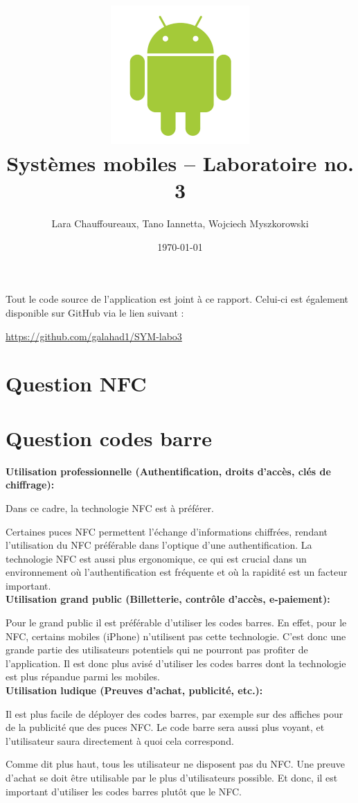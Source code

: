 \documentclass[12pt]{article}
\title{\includegraphics[width=200px]{title}\\
  \vspace{40 mm}
  \huge{Systèmes mobiles -- Laboratoire no. 3}
\vspace{20 mm}
}
\author{Lara Chauffoureaux, Tano Iannetta, Wojciech Myszkorowski}
\date{\today}
\begin{document}
\maketitle
\thispagestyle{empty}
\clearpage

Tout le code source de l'application est joint à ce rapport. Celui-ci est également disponible sur GitHub via le lien suivant : 

\url{https://github.com/galahad1/SYM-labo3}

\section*{Question NFC}

\section*{Question codes barre}

\textbf{Utilisation professionnelle (Authentification, droits d'accès, clés de chiffrage):}
\medskip

Dans ce cadre, la technologie NFC est à préférer.

Certaines puces NFC permettent l'échange d'informations chiffrées, rendant l'utilisation du NFC préférable dans l'optique d'une authentification.
La technologie NFC est aussi plus ergonomique, ce qui est crucial dans un environnement où l'authentification est fréquente et où la rapidité est un facteur important. \\

\textbf{Utilisation grand public (Billetterie, contrôle d'accès, e-paiement):} \medskip

Pour le grand public il est préférable d'utiliser les codes barres. En effet, pour le NFC, certains mobiles (iPhone) n'utilisent pas cette technologie. C'est donc une grande partie des utilisateurs potentiels qui ne pourront pas profiter de l'application. Il est donc plus avisé d'utiliser les codes barres dont la technologie est plus répandue parmi les mobiles.\\

\textbf{Utilisation ludique (Preuves d'achat, publicité, etc.):}
\medskip

Il est plus facile de déployer des codes barres, par exemple sur des affiches pour de la publicité que des puces NFC. Le code  barre sera aussi plus voyant, et l'utilisateur saura directement à quoi cela correspond.

Comme dit plus haut, tous les utilisateur ne disposent pas du NFC.
Une preuve d'achat se doit être utilisable par le plus d'utilisateurs possible. Et donc, il est important d'utiliser les codes barres plutôt que le NFC. \\
\end{document}
